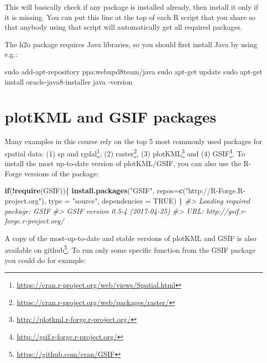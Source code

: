 \documentclass[graybox,natbib,nospthms,UStrade]{svmono}
\newenvironment{Shaded}{\begin{snugshade}}{\end{snugshade}}
\newcommand{\CommentTok}[1]{\textcolor[rgb]{0.37,0.37,0.37}{\textit{#1}}}
\newcommand{\ControlFlowTok}[1]{\textcolor[rgb]{0.27,0.27,0.27}{\textbf{#1}}}
\newcommand{\DataTypeTok}[1]{\textcolor[rgb]{0.27,0.27,0.27}{#1}}
\newcommand{\ExtensionTok}[1]{#1}
\newcommand{\FunctionTok}[1]{\textcolor[rgb]{0,0,0}{#1}}
\newcommand{\KeywordTok}[1]{\textcolor[rgb]{0.27,0.27,0.27}{\textbf{#1}}}
\newcommand{\NormalTok}[1]{#1}
\newcommand{\OperatorTok}[1]{\textcolor[rgb]{0.43,0.43,0.43}{\textbf{#1}}}
\newcommand{\OtherTok}[1]{\textcolor[rgb]{0.37,0.37,0.37}{#1}}
\newcommand{\StringTok}[1]{\textcolor[rgb]{0.5,0.5,0.5}{#1}}
\renewcommand{\href}[2]{#2 (\url{#1})}
\renewcommand{\href}[2]{#2\footnote{\url{#1}}}
\begin{document}
This will basically check if any package is installed already, then install it only if it is missing. You can put this line at the top of each R script that you share so that anybody using that script will automatically get all required packages.

The h2o package requires Java libraries, so you should first install Java by using e.g.:

\begin{Shaded}
\begin{Highlighting}[]
\FunctionTok{sudo}\NormalTok{ add-apt-repository ppa:webupd8team/java}
\FunctionTok{sudo}\NormalTok{ apt-get update}
\FunctionTok{sudo}\NormalTok{ apt-get install oracle-java8-installer}
\ExtensionTok{java}\NormalTok{ -version}
\end{Highlighting}
\end{Shaded}

\hypertarget{plotkml-and-gsif-packages}{%
\section{plotKML and GSIF packages}\label{plotkml-and-gsif-packages}}

Many examples in this course rely on the top 5 most commonly used packages for spatial data: (1) \href{https://cran.r-project.org/web/views/Spatial.html}{sp and rgdal}, (2) \href{https://cran.r-project.org/web/packages/raster/}{raster}, (3) \href{http://plotkml.r-forge.r-project.org/}{plotKML} and (4) \href{http://gsif.r-forge.r-project.org/}{GSIF}. To install the most up-to-date version of plotKML/GSIF, you can also use the R-Forge versions of the package:

\begin{Shaded}
\begin{Highlighting}[]
\ControlFlowTok{if}\NormalTok{(}\OperatorTok{!}\KeywordTok{require}\NormalTok{(GSIF))\{}
  \KeywordTok{install.packages}\NormalTok{(}\StringTok{"GSIF"}\NormalTok{, }\DataTypeTok{repos=}\KeywordTok{c}\NormalTok{(}\StringTok{"http://R-Forge.R-project.org"}\NormalTok{), }
                 \DataTypeTok{type =} \StringTok{"source"}\NormalTok{, }\DataTypeTok{dependencies =} \OtherTok{TRUE}\NormalTok{)}
\NormalTok{\}}
\CommentTok{#> Loading required package: GSIF}
\CommentTok{#> GSIF version 0.5-4 (2017-04-25)}
\CommentTok{#> URL: http://gsif.r-forge.r-project.org/}
\end{Highlighting}
\end{Shaded}

A copy of the most-up-to-date and stable versions of plotKML and GSIF is also available on \href{https://github.com/cran/GSIF}{github}. To run only some specific function from the GSIF package you could do for example:
\end{document}
